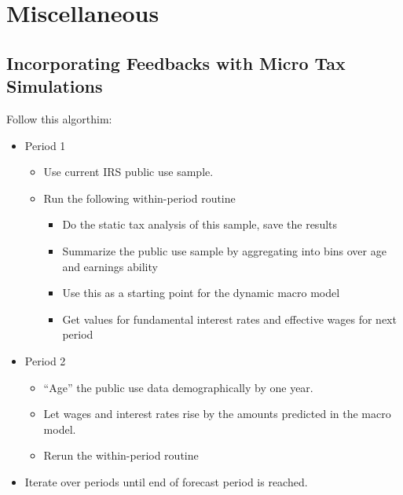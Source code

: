 \documentclass[12pt]{report}
\theoremstyle{definition}
\begin{document}















\chapter{Miscellaneous}
%



\section{Incorporating Feedbacks with Micro Tax Simulations}\label{SecMicro}

  Follow this algorthim:
  \begin{itemize}
    \item Period 1
    \begin{itemize}
      \item Use current IRS public use sample.
      \item Run the following within-period routine
      \begin{itemize}
        \item Do the static tax analysis of this sample, save the results
        \item Summarize the public use sample by aggregating into bins over age and earnings ability
        \item Use this as a starting point for the dynamic macro model
        \item Get values for fundamental interest rates and effective wages for next period
      \end{itemize}
    \end{itemize}
  \item Period 2
    \begin{itemize}
      \item “Age” the public use data demographically by one year.
      \item Let wages and interest rates rise by the amounts predicted in the macro model.
      \item Rerun the within-period routine
    \end{itemize}
  \item Iterate over periods until end of forecast period is reached.
  \end{itemize}
\end{document}
